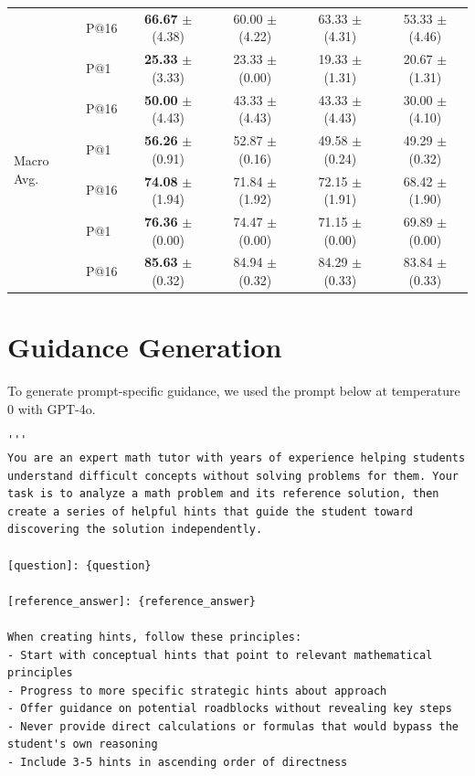 \documentclass{article}
\begin{document}
{\begin{table}[H]
{\begin{tabular}{llcccc}
                                 & P@16 & \textbf{66.67} $\pm$ (4.38) & 60.00          $\pm$ (4.22) & 63.33 $\pm$ (4.31) & 53.33 $\pm$ (4.46) \\ \addlinespace[3pt]
    \multirow{2}{*}{AIME 25}     & P@1  & \textbf{25.33} $\pm$ (3.33) & 23.33          $\pm$ (0.00) & 19.33 $\pm$ (1.31) & 20.67 $\pm$ (1.31) \\
                                 & P@16 & \textbf{50.00} $\pm$ (4.43) & 43.33          $\pm$ (4.43) & 43.33 $\pm$ (4.43) & 30.00 $\pm$ (4.10) \\ \midrule
    \multirow{2}{*}{Macro Avg.}  & P@1  & \textbf{56.26} $\pm$ (0.91) & 52.87          $\pm$ (0.16) & 49.58 $\pm$ (0.24) & 49.29 $\pm$ (0.32) \\ \addlinespace[3pt]
                                 & P@16 & \textbf{74.08} $\pm$ (1.94) & 71.84          $\pm$ (1.92) & 72.15 $\pm$ (1.91) & 68.42 $\pm$ (1.90) \\ \addlinespace[3pt]
    \multirow{2}{*}{Micro Avg.}  & P@1  & \textbf{76.36} $\pm$ (0.00) & 74.47          $\pm$ (0.00) & 71.15 $\pm$ (0.00) & 69.89 $\pm$ (0.00) \\
                                 & P@16 & \textbf{85.63} $\pm$ (0.32) & 84.94          $\pm$ (0.32) & 84.29 $\pm$ (0.33) & 83.84 $\pm$ (0.33) \\
    \bottomrule
    \end{tabular}
    }
    \label{app:main_results_full_large}
\end{table}

\section{Guidance Generation}
\label{app:guidance_generation}

To generate prompt-specific guidance, we used the prompt below at temperature 0 with GPT-4o.

\begin{Verbatim}[breaklines=true]
'''
You are an expert math tutor with years of experience helping students understand difficult concepts without solving problems for them. Your task is to analyze a math problem and its reference solution, then create a series of helpful hints that guide the student toward discovering the solution independently.

[question]: {question}

[reference_answer]: {reference_answer}

When creating hints, follow these principles:
- Start with conceptual hints that point to relevant mathematical principles
- Progress to more specific strategic hints about approach
- Offer guidance on potential roadblocks without revealing key steps
- Never provide direct calculations or formulas that would bypass the student's own reasoning
- Include 3-5 hints in ascending order of directness


\end{Verbatim}}
\end{document}

